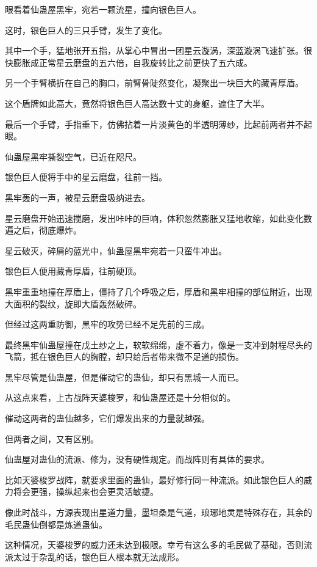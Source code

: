 
\begin{this_body}

眼看着仙蛊屋黑牢，宛若一颗流星，撞向银色巨人。

这时，银色巨人的三只手臂，发生了变化。

其中一个手，猛地张开五指，从掌心中冒出一团星云漩涡，深蓝漩涡飞速扩张。很快膨胀成正常星云磨盘的五六倍，自我旋转比之前更快了五六成。

另一个手臂横折在自己的胸口，前臂骨陡然变化，凝聚出一块巨大的藏青厚盾。

这个盾牌如此高大，竟然将银色巨人高达数十丈的身躯，遮住了大半。

最后一个手臂，手指垂下，仿佛拈着一片淡黄色的半透明薄纱，比起前两者并不起眼。

仙蛊屋黑牢撕裂空气，已近在咫尺。

银色巨人便将手中的星云磨盘，往前一挡。

黑牢轰的一声，被星云磨盘吸纳进去。

星云磨盘开始迅速搅磨，发出咔咔的巨响，体积忽然膨胀又猛地收缩，如此变化数遍之后，彻底爆炸。

星云破灭，碎屑的蓝光中，仙蛊屋黑牢宛若一只蛮牛冲出。

银色巨人便用藏青厚盾，往前硬顶。

黑牢重重地撞在厚盾上，僵持了几个呼吸之后，厚盾和黑牢相撞的部位附近，出现大面积的裂纹，旋即大盾轰然破碎。

但经过这两重防御，黑牢的攻势已经不足先前的三成。

最终黑牢仙蛊屋撞在戊土纱之上，软软绵绵，虚不着力，像是一支冲到射程尽头的飞箭，抵在银色巨人的胸膛，却只给后者带来微不足道的损伤。

黑牢尽管是仙蛊屋，但是催动它的蛊仙，却只有黑城一人而已。

从这点来看，上古战阵天婆梭罗，和仙蛊屋还是十分相似的。

催动这两者的蛊仙越多，它们爆发出来的力量就越强。

但两者之间，又有区别。

仙蛊屋对蛊仙的流派、修为，没有硬性规定。而战阵则有具体的要求。

比如天婆梭罗战阵，就要求里面的蛊仙，最好修行同一种流派。如此银色巨人的威力将会更强，操纵起来也会更灵活敏捷。

像此时战斗，方源表现出星道力量，墨坦桑是气道，琅琊地灵是特殊存在，其余的毛民蛊仙倒都是炼道蛊仙。

这种情况，天婆梭罗的威力还未达到极限。幸亏有这么多的毛民做了基础，否则流派太过于杂乱的话，银色巨人根本就无法成形。


\end{this_body}
